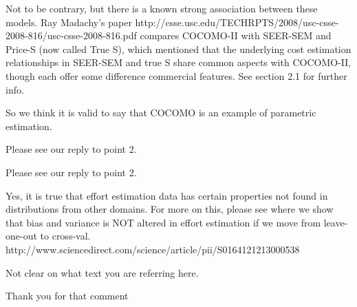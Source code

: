 Not to be contrary, but there is a known
strong association between these models.
Ray Madachy's paper http://csse.usc.edu/TECHRPTS/2008/usc-csse-2008-816/usc-csse-2008-816.pdf
compares COCOMO-II with SEER-SEM and Price-S (now called True S), which mentioned that the underlying cost estimation relationships in SEER-SEM and true S share  common aspects with COCOMO-II, though each offer some difference commercial features. See section 2.1 for further info.

So we think it is valid to say that COCOMO is an example of parametric estimation.



Please see our reply to point 2.



Please see our reply to point 2.


Yes, it is true that effort estimation data
has certain properties not found in distributions
from other domains. For more on this, please see
where we show that bias and variance is NOT altered
in effort estimation if we move from leave-one-out to cross-val. http://www.sciencedirect.com/science/article/pii/S0164121213000538


Not clear on what text you are referring  here.


Thank you for that comment

